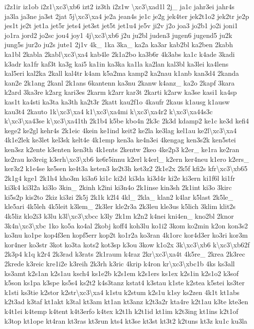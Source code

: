 \begin{DoxyCompactItemize}
i2z1ir iz1ob i2z1\textbackslash{}xc3\textbackslash{}xb6 izt2 iz3th i2z1w \textbackslash{}xc3\textbackslash{}xad1l 2j\-\_\- ja1c jahr3ei jahr4s ja3la ja3ne ja3st 2jat 5j\textbackslash{}xc3\textbackslash{}xa4 je2a jean4s je1c je2g jek4ter jek2t1o2 jek2tr je2p jes1t je2t jet1a jet5r jets4 jet3st jet5t jet1u4 je5v ji2v j2o joa3 jo2b1 jo2i joni1 jo1ra jord2 jo2sc jou4 joy1 4j\textbackslash{}xc3\textbackslash{}xb6 j2u ju2bl juden3 jugen6 jugend5 ju2k jung5s jur2o ju2s jute1 2j1v 4k\-\_\- 1ka 3ka\-\_\- ka2a ka3ar kab2bl ka2ben 2kabh ka1bl 2kabla 2kabl\textbackslash{}xc3\textbackslash{}xa4 kab4le 2k1a2bo ka3b6r 4k3abs ka1c k4ade 3kadi k3adr ka1fr kaf3t ka3g kai5 ka1in ka3ka ka1la ka2lan kal3bl ka3lei ka4lens kal5eri kal2ka 2kall kal4tr k4am k5a2ma kamp2 ka2nau k1anb kan3d4 2kanda kan2e 2k1ang 2kanl 2k1ans 6kantenn ka3nu 2kanw k4anz\-\_\- ka2o 2kapf 3kara k2ard 3ka3re k2arg kari3es 2karm k2arr kar3t 2karti k2arw ka3se kasi1 ka4sp kas1t ka4sti ka3ta ka3th ka2t3r 2katt kau2f1o 4kaufr 2kaus k1ausg k1ausw kau3t4 2kauto 1k\textbackslash{}xc3\textbackslash{}xa4 k1\textbackslash{}xc3\textbackslash{}xa4mi k\textbackslash{}xc3\textbackslash{}xa4r2 k\textbackslash{}xc3\textbackslash{}xa44s3c k\textbackslash{}xc3\textbackslash{}xa43se k\textbackslash{}xc3\textbackslash{}xa41th 2k1b4 k5be kbo4n 2k3c 2k3d kdamp2 ke1c ke3d kefi4 kege2 ke2gl kehr4s 2k1eic 4kein ke1ind keit2 ke2la ke3lag kel1au ke2l\textbackslash{}xc3\textbackslash{}xa4 4k1e2lek ke3let kel3sk kelt4e 4k1emp ken3a ke4n3ei 4kengag ken3s2k ken5stei ken3sz k2ente k3enten ken3th 4k1ents 2kentw 2keo 4ke2p3 k2er\-\_\- ke1ra ke2ran ke2rau ke3reig k3erh\textbackslash{}xc3\textbackslash{}xb6 ke6r5innu k2erl k4erl\-\_\- k2ern ker4neu k1ero k2ers\-\_\- ker3z2 k1e4se ke5sen ke4t3a keten3 ke2t3h ket3z2 2k1e2x 2k5f kfi2s kfr\textbackslash{}xc3\textbackslash{}xb65 2k1g4 kge1 2k1h4 kho3m ki3a6 ki1c ki2d ki3da ki3d4r ki2e ki3ern ki1f6l ki1fr ki3k4 ki3l2a ki3lo 3kin\-\_\- 2kinh k2ini ki3n4o 2k1inse kin3sh 2k1int ki3o 3kirc ki5s2p kis2to 2kiz ki3zi 2k5j 2k1k k2l4 4kl\-\_\- 2kla\-\_\- klan2 k4lar k5last 2k5le\-\_\- kle5ari 4k5leh 4k5leit k3lem\-\_\- 2k3ler kle2r3a 2k3leu kle3us k5lich 3klim klit2s 4k5liz klo2i3 k3lu k3l\textbackslash{}xc3\textbackslash{}xbcc k3ly 2k1m k2n2 k4nei kni4en\-\_\- kno2bl 2knor 3k4n\textbackslash{}xc3\textbackslash{}xbc 1ko ko5a ko4al 2kobj koff4 koh3lu ko1i2 3kom ko2min k2on kon3s2 ko3nu ko1pe kop4f3en kopf5err kop2t ko1r2a ko3ran 4k1orc kor4d3er ko3ri kor3m kor4ner ko3str 3kot ko3ta kots2 kot3sp k3ou 3kow k1o2x 3k\textbackslash{}xc3\textbackslash{}xb6 k\textbackslash{}xc3\textbackslash{}xb62f 2k3p4 k1q k2r4 2k3rad k3rats 2k1raum k4raz 2kr\textbackslash{}xc3\textbackslash{}xa4t 4k5re\-\_\- 2krea 2k3rec 2krede k3reic kre1i2e k3reih 2k3rh k3ric 4krip k4ron kr\textbackslash{}xc3\textbackslash{}xbc1b 4ks ks3all ks3amt k2s1an k2s1au ksch4 ks1e2b k2s1em k2s1ers ks1ex k2s1in k2s1o2 k3sof k5son ks1pa k3spe ks5s4 ks2t2 k4s3tanz kstat4 k3stau k1ste k2stea k5stei ks3ter k1sti ks3tie k2stor k2str\textbackslash{}xc3\textbackslash{}xa4 k1stu k2stum k2s1u k1sy ks2zen 4k1t kt1abs k2t3ad k3taf kt1akt k3tal kt3am kt1an kt3anz k2t3a2r kta4re k2t1au k3te kte3en k4t1ei k4temp k4tent k4t3erfo k4tex k2t1h k2t1id kt1im k2t3ing kt1ins k2t1of k3top kt1ope kt4ran kt3ras kt3run kts4 kt3se kt3st kt3t2 k2tuns kt3z ku1c ku3la 
\end{DoxyCompactItemize}
